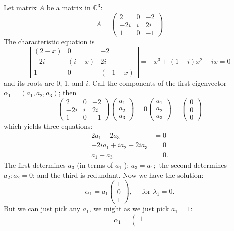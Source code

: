\documentclass[main.tex]{subfiles}
\begin{document}
\begin{example}
    Let matrix $A$ be a matrix in $\mathbb{C}^3$:
$$
A=\left(\begin{array}{ccc}
2 & 0 & -2 \\
-2 i & i & 2 i \\
1 & 0 & -1
\end{array}\right)
$$
The characteristic equation is
$$
\left|\begin{array}{ccc}
(2-x) & 0 & -2 \\
-2 i & (i-x) & 2 i \\
1 & 0 & (-1-x)
\end{array}\right|=-x^3+(1+i) x^2-i x=0
$$
and its roots are 0, 1, and $i$. Call the components of the first eigenvector $\alpha_1 = \left(a_1, a_2, a_3\right)$; then
$$
\left(\begin{array}{ccc}
2 & 0 & -2 \\
-2 i & i & 2 i \\
1 & 0 & -1
\end{array}\right)\left(\begin{array}{l}
a_1 \\
a_2 \\
a_3
\end{array}\right)=0\left(\begin{array}{l}
a_1 \\
a_2 \\
a_3
\end{array}\right)=\left(\begin{array}{l}
0 \\
0 \\
0
\end{array}\right)
$$
which yields three equations:
$$
\begin{aligned}
2 a_1-2 a_3 & =0 \\
-2 i a_1+i a_2+2 i a_3 & =0 \\
a_1-a_3 & =0 .
\end{aligned}
$$
The first determines $a_3$ (in terms of $a_1$ ): $a_3=a_1 ;$ the second determines $a_2: a_2=0$; and the third is redundant. Now we have the solution: 
$$
\alpha_1=a_1\left(\begin{array}{l}
1 \\
0 \\
1
\end{array}\right), \quad \text { for } \lambda_1=0.
$$
But we can just pick any $a_1$, we might as we just pick $a_1 = 1$: $$
\alpha_1=\left(\begin{array}{l}
1 \\

\end{array}$$
\end{example}
\end{document}
